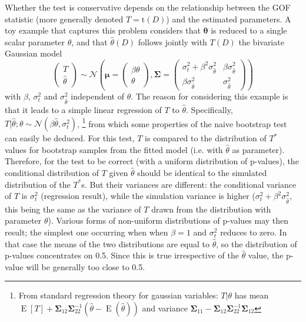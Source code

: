 \documentclass[a4paper]{article}\usepackage[]{graphicx}\usepackage[]{color}
\newcommand{\data}{\ensuremath{D}}
\newcommand{\tfn}{\ensuremath{\mathrm{t}}}
\newcommand{\bth}{\ensuremath{\boldsymbol{\theta}}}
\newcommand{\bSigma}{\ensuremath{\boldsymbol{\Sigma}}}
\DeclareMathOperator{\Esp}{E}
\begin{document}
Whether the test is conservative depends on the relationship between the GOF statistic (more generally denoted $T=\tfn(D)$) and the estimated parameters. A toy example that captures this problem considers that $\bth$ is reduced to a single scalar parameter $\theta$, and that $\hat{\theta}(\data)$ follows jointly with $T(\data)$ the bivariate Gaussian model \begin{equation*}
	\begin{pmatrix}T\\  \hat{\theta}\end{pmatrix} \sim \mathcal{N}\left(\boldsymbol{\mu}=\begin{pmatrix}\beta \theta\\ \theta\end{pmatrix}, \bSigma=\begin{pmatrix}
	\sigma^2_t+\beta^2 \sigma^2_{\hat{\theta}}& \beta \sigma^2_{\hat{\theta}}\\
	\beta \sigma^2_{\hat{\theta}}& \sigma^2_{\hat{\theta}}
	\end{pmatrix}\right)
\end{equation*}
with $\beta$, $\sigma^2_t$ and $\sigma^2_{\hat{\theta}}$ independent of $\theta$. The reason for considering this example is that it leads to a simple linear regression of $T$ to $\hat{\theta}$. Specifically, $T|\hat{\theta}; \theta \sim \mathcal{N}(\beta\hat{\theta},\sigma^2_t)$,%
%
\footnote{From standard regression theory for gaussian variables: $T|\theta$ has mean $\Esp[T]+\bSigma_{12} \bSigma_{22}^{-1}(\hat{\theta}-\Esp(\hat{\theta}))$ and variance $\bSigma_{11}-\bSigma_{12} \bSigma_{22}^{-1}\bSigma_{12}$} %
%
from which some properties of the naive bootstrap test can easily be deduced. For this test, $T$ is compared to the distribution of $T^*$ values for bootstrap samples from the fitted model (i.e. with $\hat{\theta}$ as parameter). Therefore, for the test to be correct (with a uniform distribution of p-values), the conditional distribution of $T$ given $\hat{\theta}$ should be identical to the simulated distribution of the $T^*$s. But their variances are different: the conditional variance of $T$ is $\sigma^2_t$ (regression result), while the simulation variance is higher ($\sigma^2_t+\beta^2 \sigma^2_{\hat{\theta}}$, this being the same as the variance of $T$ drawn from the distribution with parameter $\theta$).  Various forms of non-uniform distributions of p-values may then result; the simplest one occurring when when $\beta=1$ and $\sigma^2_t$ reduces to zero. In that case the means of the two distributions are equal to $\hat{\theta}$, so the distribution of p-values concentrates on 0.5. Since this is true irrespective of the $\hat{\theta}$ value, the p-value will be generally too close to 0.5.
\end{document}
